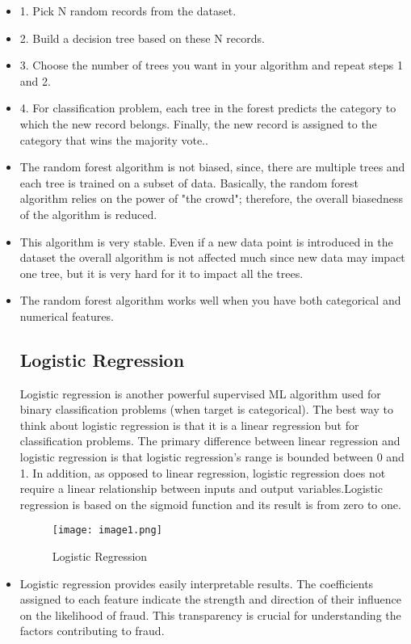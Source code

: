 \begin{itemize}
\item 1. Pick N random records from the dataset.
\item 2. Build a decision tree based on these N records.
\item 3. Choose the number of trees you want in your
algorithm and repeat steps 1 and 2.
\item 4. For classification problem, each tree in the forest
predicts the category to which the new record belongs.
Finally, the new record is assigned to the category that
wins the majority vote..\medskip
\end{itemize}
\begin{itemize}
\item  The random forest algorithm is not biased, since,
there are multiple trees and each tree is trained on a
subset of data. Basically, the random forest algorithm
relies on the power of "the crowd"; therefore, the
overall biasedness of the algorithm is reduced.
\item  This algorithm is very stable. Even if a new data
point is introduced in the dataset the overall algorithm
is not affected much since new data may impact one
tree, but it is very hard for it to impact all the trees.
\item  The random forest algorithm works well when you
have both categorical and numerical features.

\subsection{Logistic Regression}
Logistic regression is another powerful supervised ML algorithm used for binary classification problems (when target is categorical). The best way to think about logistic regression is that it is a linear regression but for classification problems. The primary difference between linear regression and logistic regression is that logistic regression's range is bounded between 0 and 1. In addition, as opposed to linear regression, logistic regression does not require a linear relationship between inputs and output variables.Logistic regression is based on the sigmoid function and its result is from zero to one. 
\medskip
\begin{figure}[h]
    \centering
    \texttt{[image: image1.png]}
    \caption{Logistic Regression}
    \label{fig:enter-label}
\end{figure}
\item Logistic regression provides easily interpretable results. The coefficients assigned to each feature indicate the strength and direction of their influence on the likelihood of fraud. This transparency is crucial for understanding the factors contributing to fraud.


\end{itemize}
